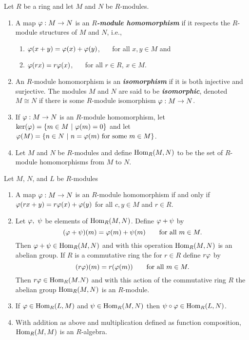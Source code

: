 \nl

\begin{defn}
Let $R$ be a ring and let $M$ and $N$ be $R$-modules.
\begin{enumerate}
\item A map $\varphi: M\rightarrow N$ is an $R$\textbf{\textit{-module homomorphism}} if it respects the $R$-module structures of $M$ and $N$, i.e.,
\begin{enumerate}
\item $\varphi(x + y) = \varphi(x) + \varphi(y)$, \ \ \ for all $x,y\in M$ and
\item $\varphi(rx) = r\varphi(x)$, \ \ \ for all $r\in R$, $x\in M$.
\end{enumerate}
\item An $R$-module homomorphism is an \textbf{\textit{isomorphism}} if it is both injective and surjective. The modules $M$ and $N$ are said to be \textbf{\textit{isomorphic}}, denoted $M\cong N$ if there is some $R$-module isomorphism $\varphi: M\rightarrow N$.
\item If $\varphi:M\rightarrow N$ is an $R$-module homomorphism, let $\ker(\vphi) = \{m\in M\ |\ \vphi(m) = 0\}$ and let $\varphi(M) = \{n\in N\ |\ n = \varphi(m)\text{ for some } m\in M\}$.
\item Let $M$ and $N$ be $R$-modules and define $\text{Hom}_R(M,N)$ to be the set of $R$-module homomorphisms from $M$ to $N$.
\end{enumerate}
\end{defn}

\nl

\begin{prop}
Let $M$, $N$, and $L$ be $R$-modules
\begin{enumerate}
\item A map $\varphi: M\rightarrow N$ is an $R$-module homomorphism if and only if $\varphi(rx + y) = r\varphi(x) + \varphi(y)$ for all $c,y\in M$ and $r\in R$.
\item Let $\varphi,\ \psi$ be elements of $\text{Hom}_R(M,N)$. Define $\varphi + \psi $ by
\[(\varphi + \psi)(m) = \varphi(m) + \psi(m)\qquad\text{for all } m\in M.\]
Then $\varphi + \psi\in \text{Hom}_R(M,N)$ and with this operation $\text{Hom}_R(M,N)$ is an abelian group. If $R$ is a commutative ring the for $r\in R$ define $r\varphi$ by 
\[(r\varphi)(m) = r(\varphi(m))\qquad\text{for all } m\in M.\]
Then $r\varphi\in\text{Hom}_R(M.N)$ and with this action of the commutative ring $R$ the abelian group $\text{Hom}_R(M,N)$ is an $R$-module.
\item If $\varphi\in\text{Hom}_R(L,M)$ and $\psi\in\text{Hom}_R(M,N)$ then $\psi\circ\varphi\in\text{Hom}_R(L,N)$.
\item With addition as above and multiplication defined as function composition, $\text{Hom}_R(M,M)$ is an $R$-algebra.
\end{enumerate}
\end{prop}

